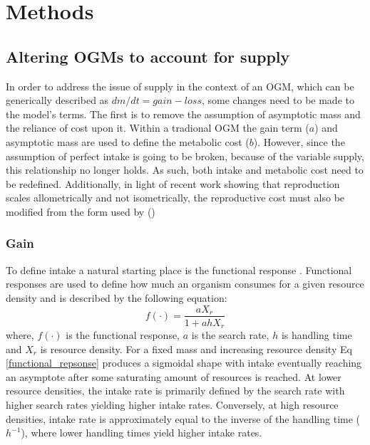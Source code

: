 \documentclass[a4paper, 11pt, hidelinks]{article} %
\begin{document}

% 
	\nolinenumbers
	
\section{Methods}
	\linenumbers
	
	\subsection{Altering OGMs to account for supply}
	In order to address the issue of supply in the context of an OGM, which can be generically described as $dm/dt = gain - loss$, some changes need to be made to the model's terms.  The first is to remove the assumption of asymptotic mass and the reliance of cost upon it.  Within a tradional OGM the gain term ($ a $) and asymptotic mass are used to define the metabolic cost ($ b $).  However, since the assumption of perfect intake is going to be broken, because of the variable supply, this relationship no longer holds.  As such, both intake and metabolic cost need to be redefined.  Additionally, in light of recent work showing that reproduction scales allometrically and not isometrically, the reproductive cost must also be modified from the form used by \citeauthor{Charnov2001} (\citeyear{Charnov2001}) \parencite{Marshall2019, Barneche2018} %
	
	
	\subsubsection{Gain}
	To define intake a natural starting place is the functional response \parencite{Holling1959}.  Functional responses  are used to define how much an organism consumes for a given resource density and is described by the following equation:	
	\begin{equation}
		\label{functional_repsonse}
		f(\cdot) = \frac{a X_r}{1 + a h X_r}
	\end{equation}
	where, $ f(\cdot) $ is the functional response, $ a $ is the search rate, $ h $ is handling time and $ X_r $ is resource density.  
	For a fixed mass and increasing resource density Eq \ref{functional_repsonse} produces a sigmoidal shape with intake eventually reaching an asymptote after some saturating amount of resources is reached.  At lower resource densities, the intake rate is primarily defined by the search rate with higher search rates yielding higher intake rates.  Conversely, at high resource densities, intake rate is approximately equal to the inverse of the handling time ($ h^{-1} $), where lower handling times yield higher intake rates.  
	
\end{document}
